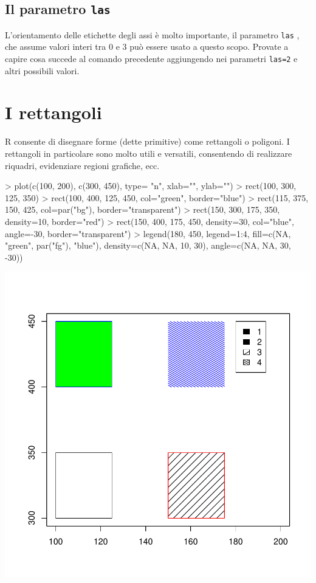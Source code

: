 \documentclass[onecolumn,11pt]{book}
\begin{document}
\subsection{Il parametro \texttt{las}}
L'orientamento delle etichette degli assi \`e molto importante, il parametro \texttt{las}  , che assume valori interi tra 0 e 3 pu\`o essere usato a questo scopo. Provate a capire cosa succede al comando precedente aggiungendo nei parametri \texttt{las=2} e altri possibili valori.


\section{I rettangoli}
\textsf{R} consente di disegnare forme (dette primitive) come rettangoli o poligoni. I rettangoli in particolare sono molto utili e versatili, consentendo di realizzare riquadri, evidenziare regioni grafiche, ecc.
\begin{Schunk}
\begin{Sinput}
> plot(c(100, 200), c(300, 450), type= "n", xlab="", ylab="") 
> rect(100, 300, 125, 350) 
> rect(100, 400, 125, 450, col="green", border="blue")  
> rect(115, 375, 150, 425, col=par("bg"), border="transparent") 
> rect(150, 300, 175, 350, density=10, border="red")
> rect(150, 400, 175, 450, density=30, col="blue", angle=-30, border="transparent")
> legend(180, 450, legend=1:4, fill=c(NA, "green", par("fg"), "blue"), density=c(NA, NA, 10, 30), angle=c(NA, NA, 30, -30))
\end{Sinput}
\end{Schunk}
\includegraphics{statisticaconR-393}
\end{document}
